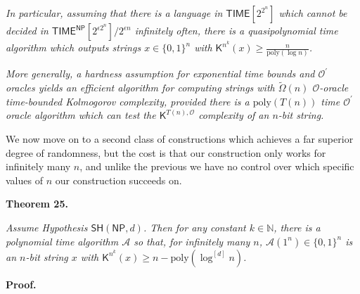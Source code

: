 \documentclass[10pt,a4paper]{article}
\begin{document}
\emph{In particular, assuming that there is a language in ${\mathsf{TIME}}[2^{2^{n}}]$ which cannot be decided in ${\mathsf{TIME}}^{\mathsf{NP}}[2^{\epsilon 2^{n}}]/2^{\epsilon n}$ infinitely often, there is a quasipolynomial time algorithm which outputs strings $x\in\{0,1\}^{n}$ with ${\mathsf{K}}^{n^{k}}(x)\geq\frac{n}{\mathrm{poly}(\log n)}$.}\par




\emph{More generally, a hardness assumption for exponential time bounds and $\mathcal{O^{\prime}}$ oracles yields an efficient algorithm for computing strings with $\tilde{\Omega}(n)$ $\mathcal{O}$-oracle time-bounded Kolmogorov complexity, provided there is a $\mathrm{poly}(T(n))$ time $\mathcal{O^{\prime}}$ oracle algorithm which can test the ${\mathsf{K}}^{T(n),\mathcal{O}}$ complexity of an $n$-bit string.}\par






We now move on to a second class of constructions which achieves a far superior degree of randomness, but the cost is that our construction only works for infinitely many $n$, and unlike the previous we have no control over which specific values of $n$ our construction succeeds on.\par





\par\medskip\noindent\textbf{
\textbf{Theorem 25}\textbf{.}
}\par



\emph{Assume Hypothesis $\mathsf{SH}({\mathsf{NP}},d)$. Then for any constant $k\in\mathbb{N}$, there is a polynomial time algorithm $\mathcal{A}$ so that, for infinitely many $n$, $\mathcal{A}(1^{n})\in\{0,1\}^{n}$ is an $n$-bit string $x$ with ${\mathsf{K}}^{n^{k}}(x)\geq n-\mathrm{poly}(\log^{[d]}n)$.}\par







\par\medskip\noindent\textbf{Proof.}\par
\end{document}
